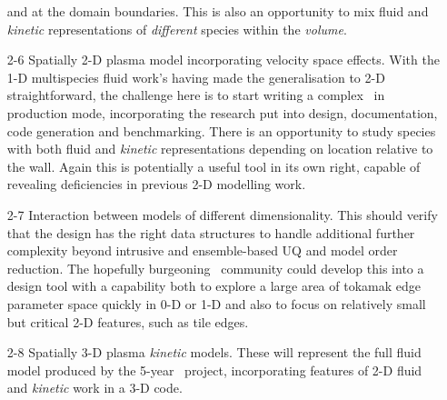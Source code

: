 \begin{itemize}
and at the domain boundaries. This is also an opportunity to mix fluid and
\emph{kinetic} representations of \emph{different} species  within the \emph{volume}.
\item[2-6] Spatially 2-D plasma model incorporating velocity space effects. 
With the 1-D multispecies fluid work's having made the generalisation to 2-D
straightforward, the challenge here is to start writing a complex \papp \
in production mode, incorporating the research put into design, documentation,
code generation and benchmarking. There is an opportunity to study species
with both fluid and \emph{kinetic} representations depending on location relative
to the wall. Again this is potentially a useful tool in its
own right, capable of revealing deficiencies in previous 2-D modelling work.
\item[2-7] Interaction between models of different dimensionality.
This should verify that the design has the right data structures to handle additional further
complexity beyond intrusive and ensemble-based UQ and model order reduction. The hopefully 
burgeoning \nep \ community
could develop this into a design tool with a capability both to explore a large
area of tokamak edge parameter space quickly in 0-D or 1-D and also to focus on
relatively small but critical 2-D features, such as tile edges.
\item[2-8] Spatially 3-D plasma \emph{kinetic} models.
These will represent the full fluid model
produced by the 5-year \nep \ project, incorporating features of 2-D fluid and
\emph{kinetic} work in a 3-D code.
\end{itemize}

